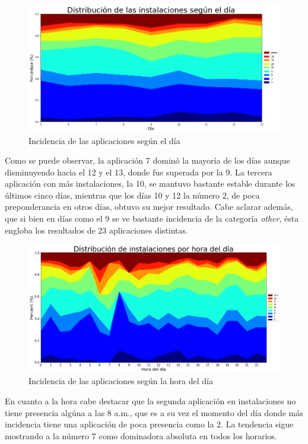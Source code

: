 \documentclass[a4paper, 12pt]{article}
\begin{document}
		\FloatBarrier
		\begin{figure}[h]
			\centering
			\includegraphics[width= \textwidth]{images/installs/appsxdiaarea.png}
			\caption{Incidencia de las aplicaciones según el día}
		\end{figure}
		\FloatBarrier

		Como se puede observar, la aplicación 7 dominó la mayoría de los días aunque disminuyendo hacia el 12 y el 13, donde fue superada por la 9. La tercera aplicación con más instalaciones, la 10, se mantuvo bastante estable durante los últimos cinco días, mientras que los días 10 y 12 la número 2, de poca preponderancia en otros días, obtuvo su mejor resultado. Cabe aclarar además, que si bien en días como el 9 se ve bastante incidencia de la categoría \textit{other}, ésta engloba los resultados de 23 aplicaciones distintas.

		\FloatBarrier
		\begin{figure}[h]
			\centering
			\includegraphics[width=\textwidth]{images/installs/appsxhora.png}
			\caption{Incidencia de las aplicaciones según la hora del día}
		\end{figure}
		\FloatBarrier

		En cuanto a la hora cabe destacar que la segunda aplicación en instalaciones no tiene presencia algúna a las 8 a.m., que es a su vez el momento del día donde más incidencia tiene una aplicación de poca presencia como la 2. La tendencia sigue mostrando a la número 7 como dominadora absoluta en todos los horarios.
\end{document}
